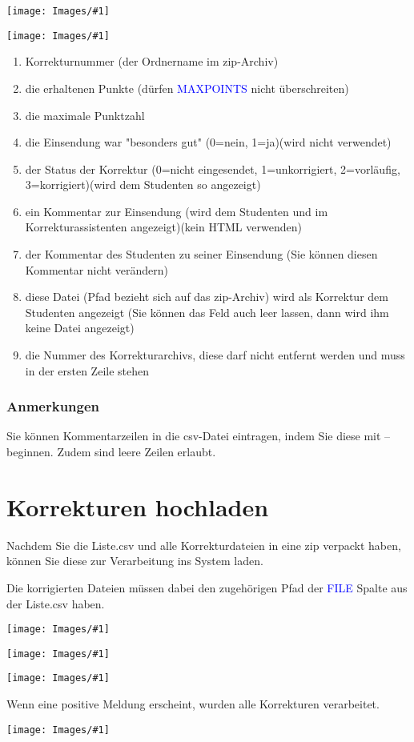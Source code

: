 \documentclass[a4paper,final, parskip]{scrartcl}
\numberwithin{equation}{section}
\newcommand{\blau}[1]{\textcolor{blue}{#1}}
\newenvironment{Bilder}
  {\par\raggedbottom\null\noindent\minipage{\textwidth}\centering}
  {\endminipage\vspace{0.7cm}}
\newcommand{\tbild}[1]{
\begin{Bilder}
 \texttt{[image: Images/\#1]}
	\end{Bilder}
}
\begin{document}
\tbild{libreA.png}

\tbild{libreB.png}
\begin{enumerate}
\item Korrekturnummer (der Ordnername im zip-Archiv)
\item die erhaltenen Punkte (dürfen \blau{MAXPOINTS} nicht überschreiten)
\item die maximale Punktzahl
\item die Einsendung war "besonders gut" (0=nein, 1=ja)(wird nicht verwendet)
\item der Status der Korrektur (0=nicht eingesendet, 1=unkorrigiert, 2=vorläufig, 3=korrigiert)(wird dem Studenten so angezeigt)
\item ein Kommentar zur Einsendung (wird dem Studenten und im Korrekturassistenten angezeigt)(kein HTML verwenden)
\item der Kommentar des Studenten zu seiner Einsendung (Sie können diesen Kommentar nicht verändern)
\item diese Datei (Pfad bezieht sich auf das zip-Archiv) wird als Korrektur dem Studenten angezeigt (Sie können das Feld auch leer lassen, dann wird ihm keine Datei angezeigt)
\item die Nummer des Korrekturarchivs, diese darf nicht entfernt werden und muss in der ersten Zeile stehen
\end{enumerate}

\subsubsection*{Anmerkungen}
Sie können Kommentarzeilen in die csv-Datei eintragen, indem Sie diese mit -- beginnen. Zudem sind leere Zeilen erlaubt.

\newpage
\section{Korrekturen hochladen}
Nachdem Sie die Liste.csv und alle Korrekturdateien in eine zip verpackt haben, können Sie diese zur Verarbeitung ins System laden. 

Die korrigierten Dateien müssen dabei den zugehörigen Pfad der \blau{FILE} Spalte aus der Liste.csv haben.

\tbild{uploadA.png}
\tbild{uploadB.png}
\tbild{uploadC.png}

Wenn eine positive Meldung erscheint, wurden alle Korrekturen verarbeitet.
\tbild{uploadD.png}
\end{document}
